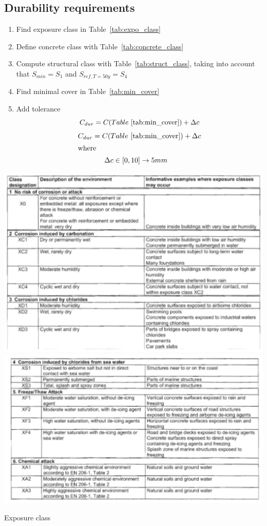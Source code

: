 \documentclass[landscape]{article}
\begin{document}
\begin{multicols*}{2}
\section{Durability requirements} %
\label{sec:durability_requirements}
\begin{enumerate}
  \item Find exposure class in Table~\ref{tab:expo_class}
  \item Define concrete class with Table~\ref{tab:concrete_class}
  \item Compute structural class with Table~\ref{tab:struct_class}, taking into account that $S_{min} =S_1$ and $S_{ref,T=50y}=S_4$
  \item Find minimal cover in Table~\ref{tab:min_cover}
  \item Add tolerance
  \[
    C_{dur} = C(Table~\ref{tab:min_cover}) + \Delta c 
  \]
   \begin{gather}\label{eq:2.1}
        C_{dur} = C(Table~\ref{tab:min_cover}) + \Delta c  \\
        \shortintertext{where}
        \begin{aligned}
          & \Delta c \in [0,10] \rightarrow 5mm 
        \end{aligned}\notag
        \end{gather}
\end{enumerate}

\begin{table}[H]
    \centering
    \includegraphics[width=0.95\linewidth]{img/expo_class}\\
    \includegraphics[width=0.95\linewidth]{img/4_1.png}
    \caption{Exposure class}
    \label{tab:expo_class}
\end{table}


\end{multicols*}
\end{document}
